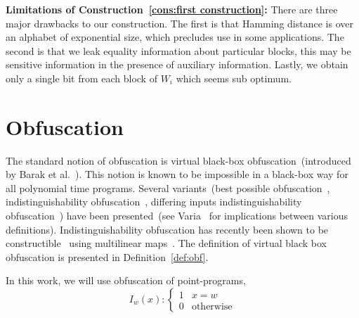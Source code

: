 \documentclass[11pt]{article}
\newcommand{\defref}[1]{\mbox{Definition~\ref{#1}}}
\newcommand{\consref}[1]{\mbox{Construction~\ref{#1}}}
\begin{document}
\textbf{Limitations of \consref{cons:first construction}:}  There are three major drawbacks to our construction.  The first is that Hamming distance is over an alphabet of exponential size, which precludes use in some applications.  The second is that we leak equality information about particular blocks, this may be sensitive information in the presence of auxiliary information.  Lastly, we obtain only a single bit from each block of $W_i$ which seems sub optimum.



\appendix
\section{Obfuscation}
\label{sec:obfuscation}
The standard notion of obfuscation is virtual black-box obfuscation~(introduced by Barak et al.~\cite{barak2001possibility}).  This notion is known to be impossible in a black-box way for all polynomial time programs.  Several variants~(best possible obfuscation~\cite{goldwasser2007best}, indistinguishability obfuscation~\cite{barak2001possibility}, differing inputs indistinguishability obfuscation~\cite{barak2001possibility}) have been presented~(see Varia~\cite{varia2010studies} for implications between various definitions).  Indistinguishability obfuscation has recently been shown to be constructible~\cite{garg2013candidate} using multilinear maps~\cite{garg2013multilinear}.  The definition of virtual black box obfuscation is presented in \defref{def:obf}.


In this work, we will use obfuscation of point-programs, 
\[
I_w(x):\begin{cases} 1 & x=w\\0 & \text{otherwise}\end{cases}
\]
\end{document}
